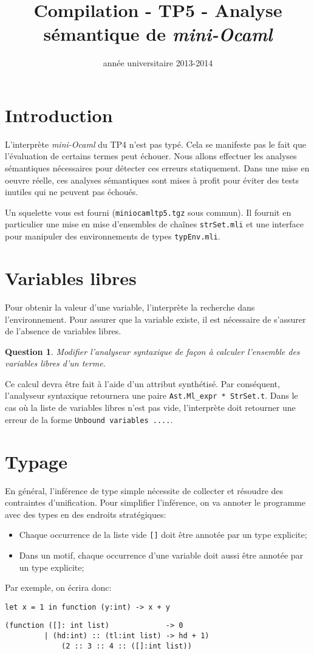 \documentclass{article}
\title{Compilation - TP5 - Analyse sémantique de \emph{mini-Ocaml}}
\date{année universitaire 2013-2014}
\newtheorem{question}{Question}[section]
\newcommand{\Question}[1]{\begin{question}#1\end{question}}
\begin{document}
\maketitle
\section{Introduction}
L'interprète \emph{mini-Ocaml} du TP4 n'est pas typé. Cela se manifeste pas le fait que l'évaluation
de certains termes peut échouer. Nous allons effectuer les analyses sémantiques nécessaires pour
détecter ces erreurs statiquement. Dans une mise en oeuvre réelle, ces analyses sémantiques
sont mises à profit pour éviter des tests inutiles qui ne peuvent pas échoués.

Un squelette vous est fourni ({\tt miniocamltp5.tgz} sous commun). Il fournit en particulier une
mise en mise d'ensembles de chaînes {\tt strSet.mli} et une interface pour manipuler des environnements de types {\tt typEnv.mli}.

\section{Variables libres}

Pour obtenir la valeur d'une variable, l'interprète la recherche dans l'environnement.  Pour assurer
que la variable existe, il est nécessaire de s'assurer de l'absence de variables libres.

\Question{Modifier l'analyseur syntaxique de façon à calculer l'ensemble des variables libres d'un
  terme.}  Ce calcul devra être fait à l'aide d'un attribut synthétisé. Par conséquent, l'analyseur
syntaxique retournera une paire {\tt Ast.Ml\_expr * StrSet.t}. Dans le cas où la liste de
variables libres n'est pas vide, l'interprète doit retourner une erreur de la forme {\tt Unbound variables ....}.

\section{Typage}

En général, l'inférence de type simple nécessite de collecter et résoudre des contraintes d'unification.
%
Pour simplifier l'inférence, on va annoter le programme avec des types en des endroits stratégiques:
\begin{itemize}
\item Chaque occurrence de la liste vide {\tt []} doit être annotée par un type explicite;
\item Dans un motif, chaque occurrence d'une variable doit aussi être annotée par un type explicite;
\end{itemize}
Par exemple, on écrira donc:\\
\begin{center}
{\tt let x = 1 in function (y:int) -> x + y }  
\end{center}
\begin{verbatim}
(function ([]: int list)             -> 0 
         | (hd:int) :: (tl:int list) -> hd + 1) 
             (2 :: 3 :: 4 :: ([]:int list))
\end{verbatim}
\end{document}

